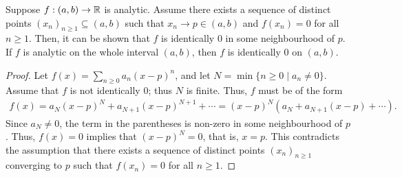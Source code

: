 Suppose $f:(a,b) \to \mathbb{R}$ is analytic. Assume there exists a sequence of distinct points $(x_{n})_{n\geq 1} \subseteq (a,b)$ such that $x_{n} \to p \in (a,b)$ and $f(x_{n}) = 0$ for all $n \geq 1$. Then, it can be shown that $f$ is identically $0$ in some neighbourhood of $p$. If $f$ is analytic on the whole interval $(a,b)$, then $f$ is identically $0$ on $(a,b)$. 

\begin{proof}
    Let $f(x) = \sum_{n \geq 0} a_{n} (x-p)^{n}$, and let $N = \min \{n \geq 0 \mid a_{n} \neq 0\}$. Assume that $f$ is not identically $0$; thus $N$ is finite. Thus, $f$ must be of the form
    \begin{align}
        f(x) = a_{N}(x-p)^{N} + a_{N+1}(x-p)^{N+1} + \cdots = (x-p)^{N} \left( a_{N} + a_{N+1}(x-p) + \cdots \right).
    \end{align}
    Since $a_{N} \neq 0$, the term in the parentheses is non-zero in some neighbourhood of $p$. Thus, $f(x) = 0$ implies that $(x-p)^{N} = 0$, that is, $x = p$. This contradicts the assumption that there exists a sequence of distinct points $(x_{n})_{n\geq 1}$ converging to $p$ such that $f(x_{n}) = 0$ for all $n \geq 1$.
\end{proof}

